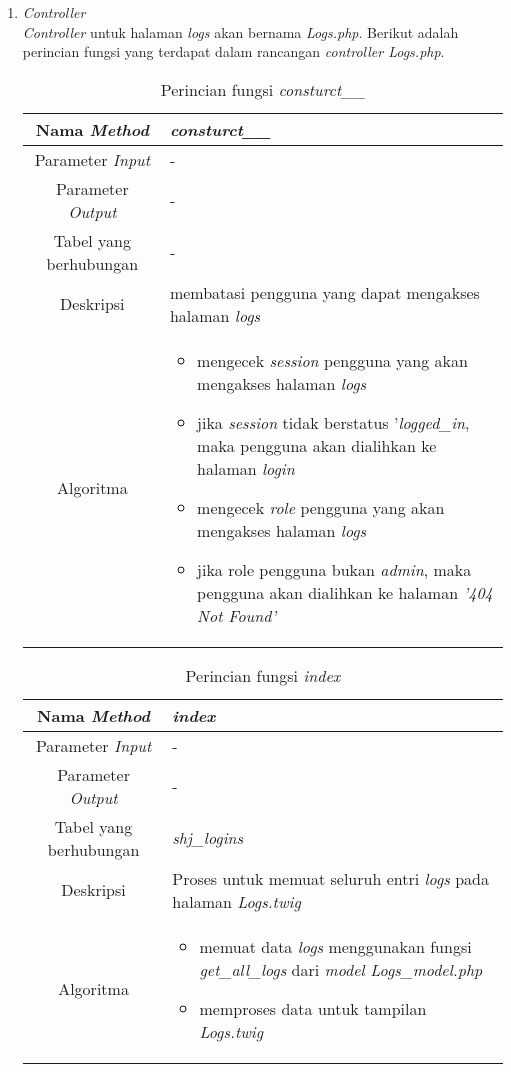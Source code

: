\begin{enumerate}
	\item \textit{Controller} \\
	\textit{Controller} untuk halaman \textit{logs} akan bernama \textit{Logs.php}. Berikut adalah perincian fungsi yang terdapat dalam rancangan \textit{controller Logs.php}.
	\begin{table}[H]
		\caption{Perincian fungsi \textit{consturct\_\_}}
		\begin{tabular}{|c|p{11cm}|}
			\hline
			Nama \textit{Method} 	& 	\textit{consturct\_\_} 	\\
			\hline
			Parameter \textit{Input} & - \\
			\hline
			Parameter \textit{Output} &  - \\
			\hline
			Tabel yang berhubungan & - \\
			\hline
			Deskripsi	& membatasi pengguna yang dapat mengakses halaman \textit{logs}	 \\
			\hline
			Algoritma	& \begin{itemize}
				\item mengecek \textit{session} pengguna yang akan mengakses halaman \textit{logs}
				\item jika \textit{session} tidak berstatus '\textit{logged\_in}, maka pengguna akan dialihkan ke halaman \textit{login}
				\item mengecek \textit{role} pengguna yang akan mengakses halaman \textit{logs}
				\item jika role pengguna bukan \textit{admin}, maka pengguna akan dialihkan ke halaman \textit{'404 Not Found'}
			\end{itemize} \\
			\hline
		\end{tabular}
	\end{table}
	
	\begin{table}[H]
		\caption{Perincian fungsi \textit{index}}
		\begin{tabular}{|c|p{11cm}|}
			\hline
			Nama \textit{Method} 	& 	\textit{index} 	\\
			\hline
			Parameter \textit{Input} & - \\
			\hline
			Parameter \textit{Output} &  - \\
			\hline
			Tabel yang berhubungan & \textit{shj\_logins} \\
			\hline
			Deskripsi	& Proses untuk memuat seluruh entri \textit{logs} pada halaman \textit{Logs.twig}	 \\
			\hline
			Algoritma	& \begin{itemize}
				\item memuat data \textit{logs} menggunakan fungsi \textit{get\_all\_logs} dari \textit{model Logs\_model.php}
				\item memproses data untuk tampilan \textit{Logs.twig}
			\end{itemize} \\
			\hline
		\end{tabular}
	\end{table}
\end{enumerate}

